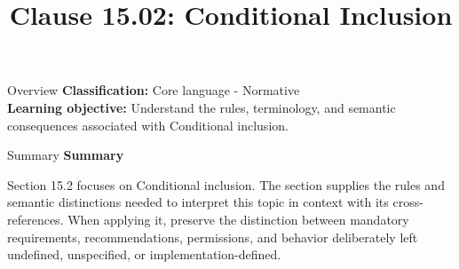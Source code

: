 \documentclass[10pt,letterpaper]{article}
\title{Clause 15.02: Conditional Inclusion}
\author{}
\date{}
\begin{document}
\maketitle
\begin{CornellOverviewBox}{Overview}
\textbf{Classification:} Core language - Normative\\[2pt]
\textbf{Learning objective:} Understand the rules, terminology, and semantic consequences associated with Conditional inclusion.
\end{CornellOverviewBox}\begin{CornellSummaryBox}{Summary}
{\sffamily\bfseries\color{Accent} Summary}\par\vspace{3pt}Section 15.2 focuses on Conditional inclusion. The section supplies the rules and semantic distinctions needed to interpret this topic in context with its cross-references. When applying it, preserve the distinction between mandatory requirements, recommendations, permissions, and behavior deliberately left undefined, unspecified, or implementation-defined.
\end{CornellSummaryBox}
\end{document}
